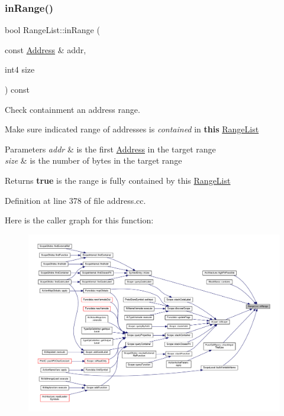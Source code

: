 \subsubsection{\texorpdfstring{inRange()}{inRange()}}
{\footnotesize\ttfamily bool Range\+List\+::in\+Range (\begin{DoxyParamCaption}\item[{const \mbox{\hyperlink{class_address}{Address}} \&}]{addr,  }\item[{int4}]{size }\end{DoxyParamCaption}) const}



Check containment an address range. 

Make sure indicated range of addresses is {\itshape contained} in {\bfseries{this}} \mbox{\hyperlink{class_range_list}{Range\+List}} 
\begin{DoxyParams}{Parameters}
{\em addr} & is the first \mbox{\hyperlink{class_address}{Address}} in the target range \\
\hline
{\em size} & is the number of bytes in the target range \\
\hline
\end{DoxyParams}
\begin{DoxyReturn}{Returns}
{\bfseries{true}} is the range is fully contained by this \mbox{\hyperlink{class_range_list}{Range\+List}} 
\end{DoxyReturn}


Definition at line 378 of file address.\+cc.

Here is the caller graph for this function\+:
\nopagebreak
\begin{figure}[H]
\begin{center}
\leavevmode
\includegraphics[width=350pt]{class_range_list_a61b4034c6930b45dd8d365c382c73b86_icgraph}
\end{center}
\end{figure}
\mbox{\label{class_range_list_ab0ab4e29f9f3b6b096e985d99daac763}} 
